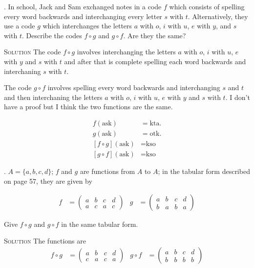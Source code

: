 \documentclass[twoside]{amsart}
\newcommand{\solution}{\textsc{Solution}\xspace}
\begin{document}
\begin{enumerate}[A.]
   . In school, Jack and Sam exchanged notes in a code $f$
   which consists of spelling every word backwards and interchanging
   every letter $s$ with $t$. Alternatively, they use a code $g$ which
   interchanges the letters $a$ with $o$, $i$ with $u$, $e$ with $y$,
   and $s$ with $t$. Describe the codes $f \circ g$ and $g \circ f$.
   Are they the same?

   \noindent \solution The code $f \circ g$ involves interchanging 
   the letters $a$ with $o$, $i$ with $u$, $e$ with $y$ and $s$ with
   $t$ and after that is complete spelling each word backwards
   and interchaning $s$ with $t$.

   The code $g \circ f$ involves spelling every word backwards and 
   interchanging $s$ and $t$ and then interchaning the letters
   $a$ with $o$, $i$ with $u$, $e$ with $y$ and $s$ with $t$.
   I don't have a proof but I think the two functions are the same.

   \begin{align*}
   f(\text{ask}) &= \text{kta}.\\
   g(\text{ask}) &= \text{otk}.\\
   [f \circ g](\text{ask}) &= \text{kso}\\
   [g \circ f](\text{ask}) &= \text{kso}
   \end{align*}
   
   . $A = \{a,b,c,d\}$; $f$ and $g$ are functions from $A$
   to $A$; in the tabular form described on page 57, they are given by

   \begin{align*}
      f &= \begin{pmatrix}
              a & b & c & d\\
	      a & c & a & c
           \end{pmatrix}  &
      g &= \begin{pmatrix}
              a & b & c & d\\
	      b & a & b & a
           \end{pmatrix}
   \end{align*}

   \noindent Give $f \circ g$ and $g \circ f$ in the same tabular form.

   \noindent \solution The functions are
   \begin{align*}
      f \circ g &= \begin{pmatrix}
                      a & b & c & d\\
		      c & a & c & a
                   \end{pmatrix} &
      g \circ f &= \begin{pmatrix}
                      a & b & c & d\\
		      b & b & b & b
                   \end{pmatrix}
   \end{align*}


\end{enumerate}
\end{document}
